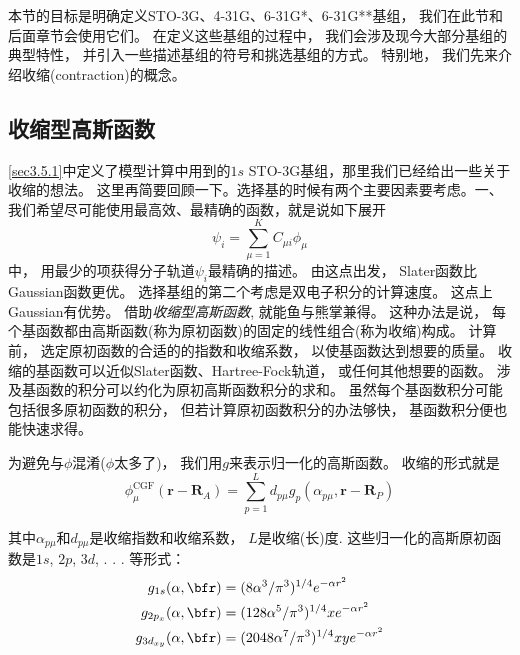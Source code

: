 本节的目标是明确定义STO-3G、4-31G、6-31G*、6-31G**基组，
我们在此节和后面章节会使用它们。
在定义这些基组的过程中，
我们会涉及现今大部分基组的典型特性，
并引入一些描述基组的符号和挑选基组的方式。
特别地，
我们先来介绍收缩(contraction)的概念。

\subsection{收缩型高斯函数}
\autoref{sec3.5.1}中定义了模型计算中用到的$1s$ STO-3G基组，那里我们已经给出一些关于收缩的想法。
这里再简要回顾一下。选择基的时候有两个主要因素要考虑。一、我们希望尽可能使用最高效、最精确的函数，就是说如下展开
\begin{equation}
	\psi_i=\sum_{\mu=1}^{K}C_{\mu i}\phi_\mu
\end{equation}
中，
用最少的项获得分子轨道$\psi_i$最精确的描述。
由这点出发，
Slater函数比Gaussian函数更优。
选择基组的第二个考虑是双电子积分的计算速度。
这点上Gaussian有优势。
借助\emph{收缩型高斯函数}, 
就能鱼与熊掌兼得。
这种办法是说，
每个基函数都由高斯函数(称为原初函数)的固定的线性组合(称为收缩)构成。
计算前，
选定原初函数的合适的的指数和收缩系数，
以使基函数达到想要的质量。
收缩的基函数可以近似Slater函数、Hartree-Fock轨道，
或任何其他想要的函数。
涉及基函数的积分可以约化为原初高斯函数积分的求和。
虽然每个基函数积分可能包括很多原初函数的积分，
但若计算原初函数积分的办法够快，
基函数积分便也能快速求得。


为避免与$\phi$混淆($\phi$太多了)，
我们用$g$来表示归一化的高斯函数。
收缩的形式就是
\begin{equation}
	\phi^\mathrm{CGF}_\mu(\mathbf{r-R}_A)=\sum_{p=1}^{L}d_{p\mu}g_p(\alpha_{p\mu},\mathbf{r-R}_P)
	\label{3.283}
\end{equation}

其中$\alpha_{p\mu}$和$d_{p\mu}$是收缩指数和收缩系数，
$L$是收缩(长)度. 
这些归一化的高斯原初函数是$1s$, 
$2p$, 
$3d$, 
.
.
.
等形式：
\begin{align}
	g_{1s}(\alpha,\bfr)      & = (8\alpha^3/\pi^3)^{1/4}       e^{-\alpha r^2}\\
	g_{2p_x}(\alpha,\bfr)    & = (128\alpha^5/\pi^3)^{1/4}  x  e^{-\alpha r^2}\\
	g_{3d_{xy}}(\alpha,\bfr) & = (2048\alpha^7/\pi^3)^{1/4} xy e^{-\alpha r^2}
\end{align}

